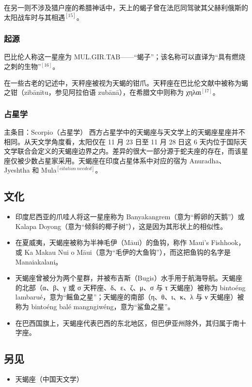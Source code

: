 在另一则不涉及猎户座的希腊神话中，天上的蝎子曾在法厄同驾驶其父赫利俄斯的太阳战车时与其相遇$^{[15]}$。
\subsubsection{起源}  
巴比伦人称这一星座为 MUL.GIR.TAB——“蝎子”；该名称可以直译为“具有燃烧之刺的生物”$^{[16]}$。

在一些古老的记述中，天秤座被视为天蝎的钳爪。天秤座在巴比伦文献中被称为蝎之钳（zibānītu，参见阿拉伯语 zubānā），在希腊文中则称为 χηλαι$^{[17]}$。
\subsubsection{占星学}  
主条目：Scorpio（占星学）  
西方占星学中的天蝎座与天文学上的天蝎座星座并不相同。从天文学角度看，太阳仅在 11 月 23 日至 11 月 28 日这 6 天内位于国际天文学联合会定义的天蝎座边界之内。差异的很大一部分源于蛇夫座的存在，而该星座仅被少数占星家采用。天蝎座在印度占星体系中对应的宿为 Anuradha、Jyeshtha 和 Mula$^{[citation\ needed]}$。
\subsection{文化}
\begin{itemize}
\item 印度尼西亚的爪哇人将这一星座称为 Banyakangrem（意为“孵卵的天鹅”）或 Kalapa Doyong（意为“倾斜的椰子树”），这是因为其形状上的相似性。
\item 在夏威夷，天蝎座被称为半神毛伊（Māui）的鱼钩，称作 Maui’s Fishhook，或 Ka Makau Nui o Māui（意为“毛伊的大鱼钩”），而这把鱼钩的名字是 Manaiakalani。
\item 天蝎座曾被分为两个星群，并被布吉斯（Bugis）水手用于航海导航。天蝎座的北部（α、β、γ 或 σ 天秤座、δ、ε、ζ、μ、σ 与 τ 天蝎座）被称为 bintoéng lambarué，意为“鳐鱼之星”；天蝎座的南部（η、θ、ι、κ、λ 与 ν 天蝎座）被称为 bintoéng balé mangngiwéng，意为“鲨鱼之星”。
\item 在巴西国旗上，天蝎座代表巴西的东北地区，但巴伊亚州除外，其归属于南十字座。
\end{itemize}
\subsection{另见}
\begin{itemize}
\item 天蝎座（中国天文学）
\end{itemize}
